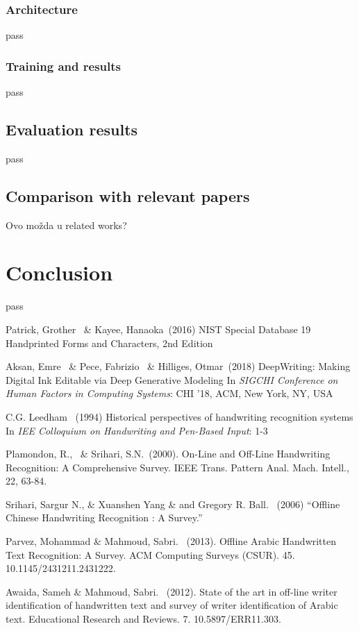 \documentclass{article}
\begin{document}
\subsubsection{Architecture}
pass 

\subsubsection{Training and results}
pass

\subsection{Evaluation results}
pass

\subsection{Comparison with relevant papers}
Ovo možda u related works?

\section{Conclusion}
pass 

\small

\begin{thebibliography}{99} 
   Patrick, Grother \ \&  Kayee, Hanaoka\ (2016) NIST Special Database 19 Handprinted Forms and Characters, 2nd Edition
  
   Aksan, Emre \ \& Pece, Fabrizio \ \& Hilliges, Otmar\ (2018) DeepWriting: Making Digital Ink Editable via Deep Generative Modeling
  In {\itshape SIGCHI Conference on Human Factors in Computing Systems}: CHI '18, ACM, New York, NY, USA
  
   C.G. Leedham \ (1994) Historical perspectives of handwriting recognition systems 
  In {\itshape IEE Colloquium on Handwriting and Pen-Based Input}: 1-3
  
   Plamondon, R., \ \& Srihari, S.N.\ (2000). 
  On-Line and Off-Line Handwriting Recognition: A Comprehensive Survey. IEEE Trans. Pattern Anal. Mach. Intell., 22, 63-84.

   Srihari, Sargur N., \& Xuanshen Yang \& and Gregory R. Ball. \ (2006) “Offline Chinese Handwriting Recognition : A Survey.”

   Parvez, Mohammad \&  Mahmoud, Sabri. \ (2013). Offline Arabic Handwritten Text Recognition: A Survey. ACM Computing Surveys (CSUR). 45. 10.1145/2431211.2431222. 

   Awaida, Sameh \& Mahmoud, Sabri. \ (2012). State of the art in off-line writer identification of handwritten text and survey of writer identification of Arabic text. Educational Research and Reviews. 7. 10.5897/ERR11.303. 
\end{thebibliography}
\end{document}
